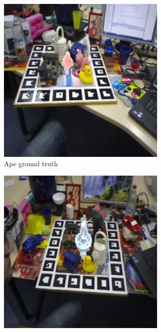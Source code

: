 \documentclass[../main.tex]{subfiles}
\begin{document}
\begin{figure}[H]
    \centering
    \begin{subfigure}[t]{0.19\textwidth}
        \centering
        \captionsetup{width=.9\textwidth}
        \includegraphics[width=0.9\textwidth]{figures/segmentation/ape_gt.png}
        \caption{Ape ground truth}
        \label{subfig:ape_ground_truth}
    \end{subfigure}
    \begin{subfigure}[t]{0.19\textwidth}
        \centering
        \captionsetup{width=.9\textwidth}
        \includegraphics[width=0.9\textwidth]{figures/segmentation/bench_vise_gt.png}

\end{subfigure}
\end{figure}
\end{document}
